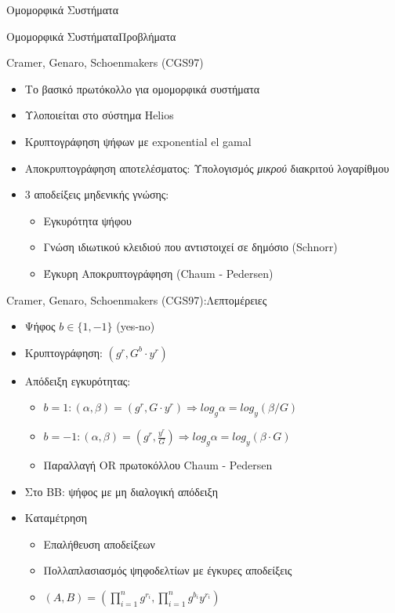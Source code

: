 \documentclass[handout]{beamer}
\begin{document}
\begin{section}{Ομομορφικά Συστήματα}
\begin{frame}{Ομομορφικά Συστήματα}{Προβλήματα}
\end{frame}

\begin{frame}{Cramer, Genaro, Schoenmakers (CGS97)}
    \begin{itemize}
        \item Το βασικό πρωτόκολλο για ομομορφικά συστήματα \pause 
        \item Υλοποιείται στο σύστημα Helios \pause 
        \item Κρυπτογράφηση ψήφων με exponential el gamal \pause 
        \item Αποκρυπτογράφηση αποτελέσματος: Υπολογισμός \pause  \emph{μικρού} διακριτού λογαρίθμου  \pause 
        \item 3 αποδείξεις μηδενικής γνώσης:
        \begin{itemize}
            \item Εγκυρότητα ψήφου
            \item Γνώση ιδιωτικού κλειδιού που αντιστοιχεί σε δημόσιο (Schnorr)
            \item Έγκυρη Αποκρυπτογράφηση (Chaum - Pedersen)
        \end{itemize}
    \end{itemize}
\end{frame}

\begin{frame}{Cramer, Genaro, Schoenmakers (CGS97):Λεπτομέρειες}
    \begin{itemize}
        \item Ψήφος $b \in \{1,-1\}$ (yes-no) \pause 
        \item Κρυπτογράφηση: $(g^r, G^b \cdot y^r)$ \pause 
        \item Απόδειξη εγκυρότητας:
        \begin{itemize}
            \item $b=1: (\alpha,\beta) = (g^r, G \cdot y^r) \Rightarrow log_g \alpha = log_y (\beta / G)$
            \item $b=-1: (\alpha,\beta) = (g^r, \frac{y^r}{G} ) \Rightarrow log_g \alpha = log_y (\beta \cdot G)$
            \item Παραλλαγή OR πρωτοκόλλου Chaum - Pedersen 
        \end{itemize}
        \item Στο BB: ψήφος με μη διαλογική απόδειξη \pause 
        \item Καταμέτρηση \pause 
        \begin{itemize}
            \item Επαλήθευση αποδείξεων \pause 
            \item Πολλαπλασιασμός ψηφοδελτίων με έγκυρες αποδείξεις
            \item $(A,B) = (\prod_{i=1}^n g^{r_i}, \prod_{i=1}^n g^{b_i}y^{r_i}) $ \pause 
            

\end{itemize}
\end{itemize}
\end{frame}
\end{section}
\end{document}
